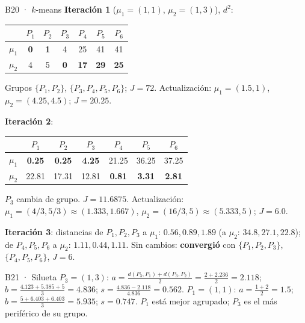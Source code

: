 \begin{solucion}{B20 · $k$-means}
\textbf{Iteración 1} ($\mu_1=(1,1)$, $\mu_2=(1,3)$), $d^2$:
\begin{center}\small
\begin{tabular}{c|cccccc}
 & $P_1$ & $P_2$ & $P_3$ & $P_4$ & $P_5$ & $P_6$\\\hline
$\mu_1$ & \textbf{0} & \textbf{1} & 4 & 25 & 41 & 41\\
$\mu_2$ & 4 & 5 & \textbf{0} & \textbf{17} & \textbf{29} & \textbf{25}
\end{tabular}
\end{center}
Grupos $\{P_1,P_2\}$, $\{P_3,P_4,P_5,P_6\}$; $J=72$. Actualización: $\mu_1=(1.5,1)$, $\mu_2=(4.25,4.5)$; $J=20.25$.

\textbf{Iteración 2}:
\begin{center}\small
\begin{tabular}{c|cccccc}
 & $P_1$ & $P_2$ & $P_3$ & $P_4$ & $P_5$ & $P_6$\\\hline
$\mu_1$ & \textbf{0.25} & \textbf{0.25} & \textbf{4.25} & 21.25 & 36.25 & 37.25\\
$\mu_2$ & 22.81 & 17.31 & 12.81 & \textbf{0.81} & \textbf{3.31} & \textbf{2.81}
\end{tabular}
\end{center}
$P_3$ cambia de grupo. $J=11.6875$. Actualización: $\mu_1=(4/3,5/3)\approx(1.333,1.667)$, $\mu_2=(16/3,5)\approx(5.333,5)$; $J=\mathbf{6.0}$.

\textbf{Iteración 3}: distancias de $P_1,P_2,P_3$ a $\mu_1$: $0.56,0.89,1.89$ (a $\mu_2$: $34.8,27.1,22.8$); de $P_4,P_5,P_6$ a $\mu_2$: $1.11,0.44,1.11$.
Sin cambios: \textbf{convergió} con $\{P_1,P_2,P_3\}$, $\{P_4,P_5,P_6\}$, $J=6$.
\end{solucion}

\begin{solucion}{B21 · Silueta}
$P_3=(1,3)$: $a=\frac{d(P_3,P_1)+d(P_3,P_2)}2=\frac{2+2.236}{2}=2.118$; $b=\frac{4.123+5.385+5}{3}=4.836$; $s=\frac{4.836-2.118}{4.836}=\mathbf{0.562}$.
$P_1=(1,1)$: $a=\frac{1+2}{2}=1.5$; $b=\frac{5+6.403+6.403}3=5.935$; $s=\mathbf{0.747}$. $P_1$ está mejor agrupado; $P_3$ es el más periférico de su grupo.
\end{solucion}


